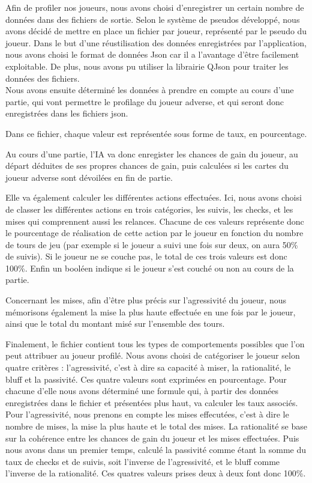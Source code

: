 \documentclass{report}
\begin{document}
\hspace{0.5cm}Afin de profiler nos joueurs, nous avons choisi d'enregistrer un certain nombre de données dans des fichiers de sortie. Selon le système de pseudos développé, nous avons décidé de mettre en place un fichier par joueur, représenté par le pseudo du joueur. Dans le but d'une réustilisation des données enregistrées par l'application, nous avons choisi le format de données Json car il a l'avantage d'être facilement exploitable. De plus, nous avons pu utiliser la librairie QJson pour traiter les données des fichiers.\\

Nous avons ensuite déterminé les données à prendre en compte au cours d'une partie, qui vont permettre le profilage du joueur adverse, et qui seront donc enregistrées dans les fichiers json.\par
Dans ce fichier, chaque valeur est représentée sous forme de taux, en pourcentage.\par
Au cours d'une partie, l'IA va donc enregister les chances de gain du joueur, au départ déduites de ses propres chances de gain, puis calculées si les cartes du joueur adverse sont dévoilées en fin de partie.\par
Elle va également calculer les différentes actions effectuées. Ici, nous avons choisi de classer les différentes actions en trois catégories, les suivis, les checks, et les mises qui comprennent aussi les relances. Chacune de ces valeurs représente donc le pourcentage de réalisation de cette action par le joueur en fonction du nombre de tours de jeu (par exemple si le joueur a suivi une fois sur deux, on aura 50\% de suivis). Si le joueur ne se couche pas, le total de ces trois valeurs est donc 100\%. Enfin un booléen indique si le joueur s'est couché ou non au cours de la partie.\par
Concernant les mises, afin d'être plus précis sur l'agressivité du joueur, nous mémorisons également la mise la plus haute effectuée en une fois par le joueur, ainsi que le total du montant misé sur l'ensemble des tours.\par
Finalement, le fichier contient tous les types de comportements possibles que l'on peut attribuer au joueur profilé. Nous avons choisi de catégoriser le joueur selon quatre critères : l'agressivité, c'est à dire sa capacité à miser, la rationalité, le bluff et la passivité. Ces quatre valeurs sont exprimées en pourcentage. Pour chacune d'elle nous avons déterminé une formule qui, à partir des données enregistrées dans le fichier et présentées plus haut, va calculer les taux associés. Pour l'agressivité, nous prenons en compte les mises effecutées, c'est à dire le nombre de mises, la mise la plus haute et le total des mises. La rationalité se base sur la cohérence entre les chances de gain du joueur et les mises effectuées. Puis nous avons dans un premier temps, calculé la passivité comme étant la somme du taux de checks et de suivis, soit l'inverse de l'agressivité, et le bluff comme l'inverse de la rationalité. Ces quatres valeurs prises deux à deux font donc 100\%.\par
\end{document}
